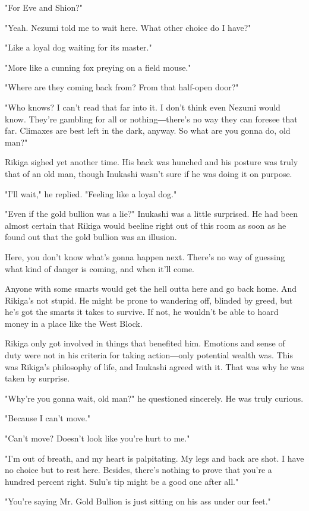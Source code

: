 "For Eve and Shion?"

"Yeah. Nezumi told me to wait here. What other choice do I have?"

"Like a loyal dog waiting for its master."

"More like a cunning fox preying on a field mouse."

"Where are they coming back from? From that half-open door?"

"Who knows? I can't read that far into it. I don't think even Nezumi
would know. They're gambling for all or nothing―there's no way they can
foresee that far. Climaxes are best left in the dark, anyway. So what
are you gonna do, old man?"

Rikiga sighed yet another time. His back was hunched and his posture was
truly that of an old man, though Inukashi wasn't sure if he was doing it
on purpose.

"I'll wait," he replied. "Feeling like a loyal dog."

"Even if the gold bullion was a lie?" Inukashi was a little surprised.
He had been almost certain that Rikiga would beeline right out of this
room as soon as he found out that the gold bullion was an illusion.

Here, you don't know what's gonna happen next. There's no way of
guessing what kind of danger is coming, and when it'll come.

Anyone with some smarts would get the hell outta here and go back home.
And Rikiga's not stupid. He might be prone to wandering off, blinded by
greed, but he's got the smarts it takes to survive. If not, he wouldn't
be able to hoard money in a place like the West Block.

Rikiga only got involved in things that benefited him. Emotions and
sense of duty were not in his criteria for taking action―only potential
wealth was. This was Rikiga's philosophy of life, and Inukashi agreed
with it. That was why he was taken by surprise.

"Why're you gonna wait, old man?" he questioned sincerely. He was truly
curious.

"Because I can't move."

"Can't move? Doesn't look like you're hurt to me."

"I'm out of breath, and my heart is palpitating. My legs and back are
shot. I have no choice but to rest here. Besides, there's nothing to
prove that you're a hundred percent right. Sulu's tip might be a good
one after all."

"You're saying Mr. Gold Bullion is just sitting on his ass under our
feet."

